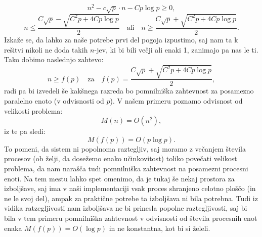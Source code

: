 \documentclass[a4paper,titlepage,11pt]{article}
\begin{document}
\begin{equation}
n^2 - c \sqrt{p} \cdot n - C p \log{p} \geq 0,
\end{equation}
\begin{equation}
n \leq \frac{C \sqrt{p} - \sqrt{C^2 p + 4 C p \log{p}}}{2} \quad \textrm{ali} \quad n \geq \frac{C \sqrt{p} + \sqrt{C^2 p + 4 C p \log{p}}}{2}.
\end{equation}
Izkaže se, da lahko za naše potrebe prvi del pogoja izpustimo, saj nam ta k rešitvi nikoli ne doda takih \(n\)-jev, ki bi bili večji ali enaki 1, zanimajo pa nas le ti. Tako dobimo naslednjo zahtevo:
\begin{equation}
n \geq f(p) \quad \textrm{za} \quad f(p) = \frac{C \sqrt{p} + \sqrt{C^2 p + 4 C p \log{p}}}{2},
\end{equation}
radi pa bi izvedeli še kakšnega razreda bo pomnilniška zahtevnost za posamezno paralelno enoto (v odvisnosti od \(p\)). V našem primeru poznamo odvisnost od velikosti problema:
\begin{equation}
M(n) = O(n^2),
\end{equation}
iz te pa sledi:
\begin{equation}
M(f(p)) = O(p \log{p}).
\end{equation}
To pomeni, da sistem ni popolnoma raztegljiv, saj moramo z večanjem števila procesov (ob želji, da dosežemo enako učinkovitost) toliko povečati velikost problema, da nam narašča tudi pomnilniška zahtevnost na posamezni procesni enoti. Na tem mestu lahko spet omenimo, da je tukaj še nekaj prostora za izboljšave, saj ima v naši implementaciji vsak proces shranjeno celotno ploščo (in ne le svoj del), ampak za praktične potrebe ta izboljšava ni bila potrebna. Tudi iz vidika ratzegljivosti nam izboljšava ne bi prinesla popolne raztegljivosti, saj bi bila v tem primeru pomnilniška zahtevnost v odvisnosti od števila procesnih enot enaka \(M(f(p)) = O(\log{p})\) in ne konstantna, kot bi si želeli.
\end{document}
